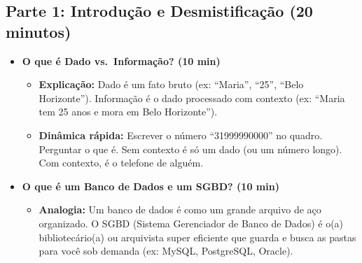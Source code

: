 \documentclass[12pt,a4paper]{article}
\begin{document}
\subsection*{Parte 1: Introdução e Desmistificação (20 minutos)}
\begin{itemize}[leftmargin=*,itemsep=0.35em]
  \item \textbf{O que é Dado vs.\ Informação? (10 min)}
  \begin{itemize}[leftmargin=*,itemsep=0.25em]
    \item \textbf{Explicação:} Dado é um fato bruto (ex: ``Maria'', ``25'', ``Belo Horizonte''). Informação é o dado processado com contexto (ex: ``Maria tem 25 anos e mora em Belo Horizonte'').
    \item \textbf{Dinâmica rápida:} Escrever o número ``31999990000'' no quadro. Perguntar o que é. Sem contexto é só um dado (ou um número longo). Com contexto, é o telefone de alguém.
  \end{itemize}

  \item \textbf{O que é um Banco de Dados e um SGBD? (10 min)}
  \begin{itemize}[leftmargin=*,itemsep=0.25em]
    \item \textbf{Analogia:} Um banco de dados é como um grande arquivo de aço organizado. O SGBD (Sistema Gerenciador de Banco de Dados) é o(a) bibliotecário(a) ou arquivista super eficiente que guarda e busca as pastas para você sob demanda (ex: MySQL, PostgreSQL, Oracle).
  \end{itemize}
\end{itemize}
\end{document}
